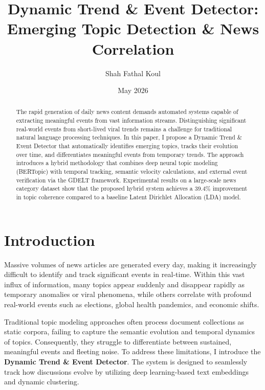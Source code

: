 \documentclass[10pt,twocolumn]{article}
\title{\textbf{Dynamic Trend \& Event Detector: Emerging Topic Detection \& News Correlation}}
\author{Shah Fathal Koul}
\date{May 2026}
\begin{document}
\maketitle

\begin{abstract}
The rapid generation of daily news content demands automated systems capable of extracting meaningful events from vast information streams. Distinguishing significant real-world events from short-lived viral trends remains a challenge for traditional natural language processing techniques. In this paper, I propose a Dynamic Trend \& Event Detector that automatically identifies emerging topics, tracks their evolution over time, and differentiates meaningful events from temporary trends. The approach introduces a hybrid methodology that combines deep neural topic modeling (BERTopic) with temporal tracking, semantic velocity calculations, and external event verification via the GDELT framework. Experimental results on a large-scale news category dataset show that the proposed hybrid system achieves a 39.4\% improvement in topic coherence compared to a baseline Latent Dirichlet Allocation (LDA) model.
\end{abstract}

\section{Introduction}
Massive volumes of news articles are generated every day, making it increasingly difficult to identify and track significant events in real-time. Within this vast influx of information, many topics appear suddenly and disappear rapidly as temporary anomalies or viral phenomena, while others correlate with profound real-world events such as elections, global health pandemics, and economic shifts.

Traditional topic modeling approaches often process document collections as static corpora, failing to capture the semantic evolution and temporal dynamics of topics. Consequently, they struggle to differentiate between sustained, meaningful events and fleeting noise. To address these limitations, I introduce the \textbf{Dynamic Trend \& Event Detector}. The system is designed to seamlessly track how discussions evolve by utilizing deep learning-based text embeddings and dynamic clustering.
\end{document}
